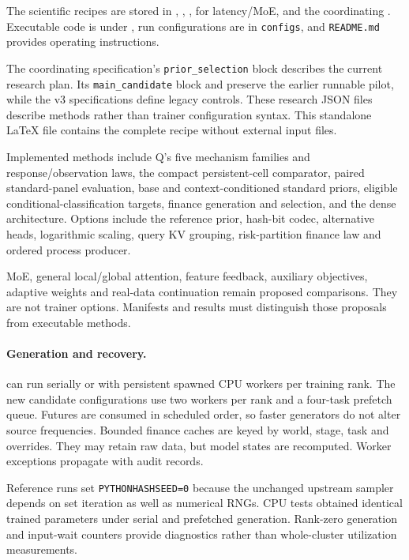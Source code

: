 \documentclass[11pt]{article}
\begin{document}
The scientific recipes are stored in , , ,  for latency/MoE, and the coordinating . Executable code is under , run configurations are in \texttt{configs}, and \texttt{README.md} provides operating instructions.

The coordinating specification's \texttt{prior\_selection} block describes the current research plan. Its \texttt{main\_candidate} block and  preserve the earlier runnable pilot, while the v3 specifications define legacy controls. These research JSON files describe methods rather than trainer configuration syntax. This standalone \LaTeX{} file contains the complete recipe without external input files.

Implemented methods include Q's five mechanism families and response/observation laws, the compact persistent-cell comparator, paired standard-panel evaluation, base and context-conditioned standard priors, eligible conditional-classification targets, finance generation and selection, and the dense architecture. Options include the reference prior, hash-bit codec, alternative heads, logarithmic scaling, query KV grouping, risk-partition finance law and ordered process producer.

MoE, general local/global attention, feature feedback, auxiliary objectives, adaptive weights and real-data continuation remain proposed comparisons. They are not trainer options. Manifests and results must distinguish those proposals from executable methods.

\paragraph{Generation and recovery.}  can run serially or with persistent spawned CPU workers per training rank. The new candidate configurations use two workers per rank and a four-task prefetch queue. Futures are consumed in scheduled order, so faster generators do not alter source frequencies. Bounded finance caches are keyed by world, stage, task and overrides. They may retain raw data, but model states are recomputed. Worker exceptions propagate with audit records.

Reference runs set \texttt{PYTHONHASHSEED=0} because the unchanged upstream sampler depends on set iteration as well as numerical RNGs. CPU tests obtained identical trained parameters under serial and prefetched generation. Rank-zero generation and input-wait counters provide diagnostics rather than whole-cluster utilization measurements.
\end{document}
